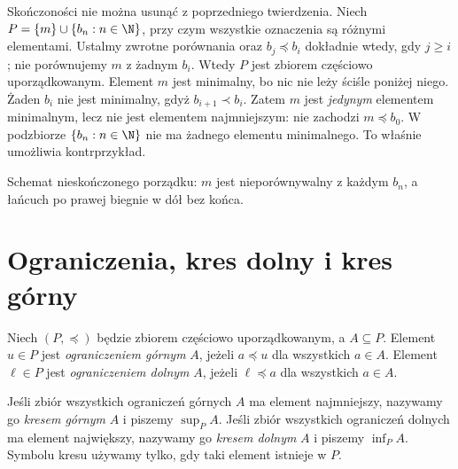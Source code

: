\begin{przyklad}
\label{ex:unique-minimal-infinite-xliii}
Skończoności nie można usunąć z poprzedniego twierdzenia.
Niech $P=\{m\}\cup\{b_n:n\in\N\}$, przy czym
wszystkie oznaczenia są różnymi elementami.
Ustalmy zwrotne porównania oraz
$b_j\preceq b_i$ dokładnie wtedy, gdy $j\ge i$;
nie porównujemy $m$ z żadnym $b_i$.
Wtedy $P$ jest zbiorem częściowo uporządkowanym.
Element $m$ jest minimalny, bo nic nie leży ściśle
poniżej niego. Żaden $b_i$ nie jest minimalny, gdyż
$b_{i+1}\prec b_i$. Zatem $m$ jest \emph{jedynym}
elementem minimalnym, lecz nie jest elementem najmniejszym:
nie zachodzi $m\preceq b_0$.
W podzbiorze $\{b_n:n\in\N\}$ nie ma żadnego
elementu minimalnego. To właśnie umożliwia kontrprzykład.

\begin{center}

{\small Schemat nieskończonego porządku: $m$ jest nieporównywalny
z każdym $b_n$, a łańcuch po prawej biegnie w dół bez końca.}
\end{center}
\end{przyklad}

\section{Ograniczenia, kres dolny i kres górny}\label{sec:order-bounds}
\begin{definicja}\label{def:bounds-sup-inf}
Niech $(P,\preceq)$ będzie zbiorem częściowo uporządkowanym,
a $A\subseteq P$.
Element $u\in P$ jest \emph{ograniczeniem górnym} $A$,
jeżeli $a\preceq u$ dla wszystkich $a\in A$.
Element $\ell\in P$ jest \emph{ograniczeniem dolnym} $A$,
jeżeli $\ell\preceq a$ dla wszystkich $a\in A$.

Jeśli zbiór wszystkich ograniczeń górnych $A$ ma element
najmniejszy, nazywamy go \emph{kresem górnym} $A$ i piszemy
$\sup_P A$. Jeśli zbiór wszystkich ograniczeń dolnych
ma element największy, nazywamy go \emph{kresem dolnym} $A$
i piszemy $\inf_P A$. Symbolu kresu używamy tylko, gdy
taki element istnieje w $P$.
\end{definicja}

